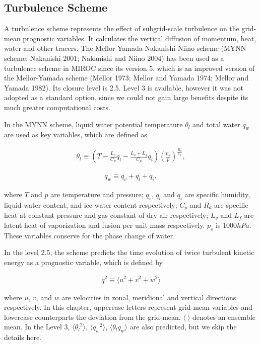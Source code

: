 \hypertarget{turbulence-scheme}{%
\subsection{Turbulence Scheme}\label{turbulence-scheme}}

A turbulence scheme represents the effect of subgrid-scale turbulence on the grid-mean prognostic variables. It calculates the vertical diffusion of momentum, heat, water and other tracers. The
Mellor-Yamada-Nakanishi-Niino scheme (MYNN scheme; Nakanishi 2001; Nakanishi and Niino 2004) has been used as a turbulence scheme in MIROC since its version 5, which is an improved version of the
Mellor-Yamada scheme (Mellor 1973; Mellor and Yamada 1974; Mellor and Yamada 1982). Its closure level is 2.5. Level 3 is available, however it was not adopted as a standard option, since we could not
gain large benefits despite its much greater computational costs.

In the MYNN scheme, liquid water potential temperature \(\theta_l\) and total water \(q_w\) are used as key variables, which are defined as

\begin{eqnarray} \theta_l \equiv \left(T - \frac{L_v}{C_p}q_l - \frac{L_v+L_f}{C_p}q_i \right) \left(\frac{p_s}{p}\right)^{\frac{R_d}{C_p}}, \end{eqnarray}

\begin{eqnarray} q_w \equiv q_v+q_l+q_i, \end{eqnarray}

where \(T\) and \(p\) are temperature and pressure; \(q_v\), \(q_l\) and \(q_i\) are specific humidity, liquid water content, and ice water content respectively; \(C_p\) and \(R_d\) are specific heat
at constant pressure and gas constant of dry air respectively; \(L_v\) and \(L_f\) are latent heat of vaporization and fusion per unit mass respectively. \(p_s\) is \(1000hPa\). These variables
conserve for the phase change of water.

In the level 2.5, the scheme predicts the time evolution of twice turbulent kinetic energy as a prognostic variable, which is defined by

\begin{eqnarray}q^2 \equiv \langle u^2 + v^2 + w^2 \rangle\end{eqnarray}

where \(u\), \(v\), and \(w\) are velocities in zonal, meridional and vertical directions respectively. In this chapter, uppercase letters represent grid-mean variables and lowercase counterparts the
deviation from the grid-mean. \(\langle \ \rangle\) denotes an ensemble mean. In the Level 3, \(\langle {\theta_l}^2 \rangle\), \(\langle {q_w}^2 \rangle\), \(\langle \theta_l q_w \rangle\) are also
predicted, but we skip the details here.

